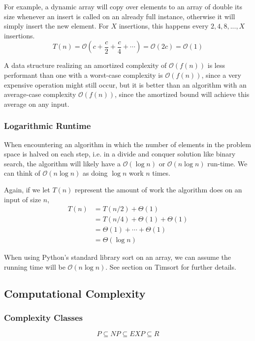 \documentclass{article}
\newcommand{\bigO}{\ensuremath{\mathcal{O}}}
\begin{document}
    For example, a dynamic array will copy over elements to an array of double its size whenever an insert is called on an already full instance, otherwise it will simply insert the new element. For $X$ insertions, this happens every $2, 4, 8, ..., X$ insertions.
    \[
        T(n) = \bigO ( c + \frac{c}{2} + \frac{c}{4} + \cdots) 
        = \bigO(2c) 
        = \bigO(1)
    \]
    
    A data structure realizing an amortized complexity of $\bigO (f(n))$ is less performant than one with a worst-case complexity is $\bigO(f(n))$, since a very expensive operation might still occur, but it is better than an algorithm with an average-case complexity $\bigO(f(n))$, since the amortized bound will achieve this average on any input.
    
    \subsubsection{Logarithmic Runtime}
    When encountering an algorithm in which the number of elements in the problem space is halved on each step, i.e. in a divide and conquer solution like binary search, the algorithm will likely have a $\bigO(\log n)$ or $\bigO(n \log n)$ run-time. We can think of $\bigO(n \log n)$ as doing $\log n$ work $n$ times. 
    
    Again, if we let $T(n)$ represent the amount of work the algorithm does on an input of size $n$,
    \begin{align*}
        T(n) &= T(n/2) + \Theta(1) \\
        &=  T(n/4)+ \Theta(1) + \Theta(1) \\ 
        &= \Theta(1) + \cdots + \Theta(1) \\
        &= \Theta(\log n ) 
    \end{align*}
    
    When using Python's standard library sort on an array, we can assume the running time will be $\bigO (n \log n)$. See section on Timsort for further details.
    
    \subsection{Computational Complexity}
    \subsubsection{Complexity Classes}
    \[
        P \subseteq NP \subseteq EXP \subseteq R
    \]
    
\end{document}
